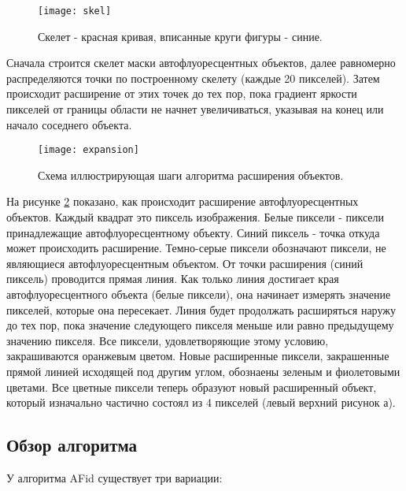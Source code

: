 \begin{figure}[H]
	\centering
	\texttt{[image: skel]}
	\caption{Скелет - красная кривая, вписанные круги фигуры - синие.}
	\label{skel}
\end{figure}

Сначала строится скелет маски автофлуоресцентных объектов, далее равномерно распределяются точки по построенному скелету (каждые 20 пикселей). Затем происходит расширение от этих точек до тех пор, пока градиент яркости пикселей от границы области не начнет увеличиваться, указывая на конец или начало соседнего объекта.\cite{Conference}


\begin{figure}[H]
	\centering
	\texttt{[image: expansion]}
	\caption{Схема иллюстрирующая шаги алгоритма расширения объектов.}
	\label{expansion}
\end{figure}

На рисунке \ref{expansion} показано, как происходит расширение автофлуоресцентных объектов. Каждый квадрат это пиксель изображения. Белые пиксели - пиксели принадлежащие автофлуоресцентному объекту. Синий пиксель - точка откуда может происходить расширение. Темно-серые пиксели обозначают пиксели, не являющиеся автофлуоресцентным объектом. От точки расширения (синий пиксель) проводится прямая линия. Как только линия достигает края автофлуоресцентного объекта (белые пиксели), она начинает измерять значение пикселей, которые она пересекает. Линия будет продолжать расширяться наружу до тех пор, пока значение
следующего пикселя меньше или равно предыдущему значению пикселя. Все пиксели, удовлетворяющие этому
условию, закрашиваются оранжевым цветом. Новые расширенные пиксели, закрашенные прямой линией исходящей под другим углом, обознаены зеленым и фиолетовыми цветами. Все цветные пиксели теперь образуют новый расширенный объект, который изначально частично состоял из 4
пикселей (левый верхний рисунок а).\cite{Conference}


\subsection{Обзор алгоритма}

У алгоритма AFid существует три вариации:\cite{Conference}



